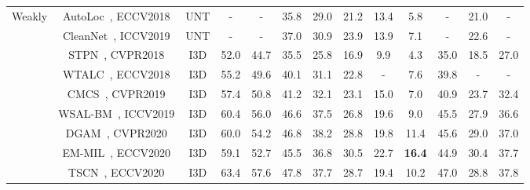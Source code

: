 \begin{table*}[t]
\begin{tabular}{c|c|c|ccccccc|ccc}
    \midrule
\multirow{22}{*}{Weakly}       
& AutoLoc~\cite{eccv2018autoloc}, ECCV2018                   & UNT                      & -             & -             & 35.8          & 29.0          & 21.2          & 13.4          & 5.8           & -             & 21.0          & -             \\
								   & CleanNet~\cite{iccv2019cleannet}, ICCV2019                 & UNT                      & -             & -             & 37.0          & 30.9          & 23.9          & 13.9          & 7.1           & -             & 22.6          & -             \\
								   \cmidrule{2-13}
								   & STPN~\cite{cvpr2018stpn}, CVPR2018                         & I3D                      & 52.0          & 44.7          & 35.5          & 25.8          & 16.9          & 9.9           & 4.3           & 35.0          & 18.5          & 27.0          \\
								   & WTALC~\cite{eccv2018wtalc}, ECCV2018                       & I3D                      & 55.2          & 49.6          & 40.1          & 31.1          & 22.8          & -             & 7.6           & 39.8          & -             & -             \\
								   & CMCS~\cite{cvpr2019cmcs}, CVPR2019                         & I3D                      & 57.4          & 50.8          & 41.2          & 32.1          & 23.1          & 15.0          & 7.0           & 40.9          & 23.7          & 32.4          \\
								   & WSAL-BM~\cite{iccv2019backgroundmodel}, ICCV2019           & I3D                      & 60.4          & 56.0          & 46.6          & 37.5          & 26.8          & 19.6          & 9.0           & 45.5          & 27.9          & 36.6          \\
& DGAM~\cite{cvpr2020DGAM}, CVPR2020                         & I3D                      & 60.0          & 54.2          & 46.8          & 38.2          & 28.8          & 19.8          & 11.4          & 45.6          & 29.0          & 37.0          \\
								   & EM-MIL~\cite{eccv2020EM-MIL}, ECCV2020                     & I3D                      & 59.1          & 52.7          & 45.5          & 36.8          & 30.5          & 22.7          & \textbf{16.4} & 44.9          & 30.4          & 37.7          \\
& TSCN~\cite{eccv2020TSCN}, ECCV2020                         & I3D                      & 63.4          & 57.6          & 47.8          & 37.7          & 28.7          & 19.4          & 10.2          & 47.0          & 28.8          & 37.8          \\

\end{tabular}
\end{table*}
